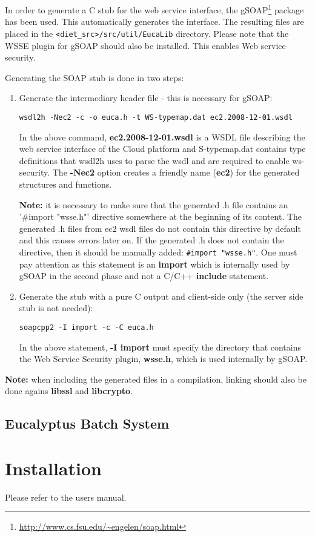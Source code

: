 In order to generate a C stub for the web service interface, the gSOAP\footnote{\url{http://www.cs.fsu.edu/~engelen/soap.html}}
package has been used. This automatically generates the interface. The resulting files
are placed in the \verb!<diet_src>/src/util/EucaLib! directory. Please note that the WSSE
plugin for gSOAP should also be installed. This enables Web service security.

Generating the SOAP stub is done in two steps:
\begin{enumerate}
\item{Generate the intermediary header file} - this is necessary for gSOAP:

\verb!wsdl2h -Nec2 -c -o euca.h -t WS-typemap.dat ec2.2008-12-01.wsdl!

In the above command, \textbf{ec2.2008-12-01.wsdl} is a WSDL file describing the web service
interface of the Cloud platform and S-typemap.dat contains type definitions that wsdl2h uses
to parse the wsdl and are required to enable ws-security. The \textbf{-Nec2} option creates
a friendly name (\textbf{ec2}) for the generated structures and functions.

\textbf{Note:} it is necessary to make sure that the generated .h file contains an '#import "wsse.h"'
directive somewhere at the beginning of its content. The generated .h files from ec2 wsdl files do not
contain this directive by default and this causes errors later on. If the generated .h does not contain
the directive, then it should be manually added: \verb!#import "wsse.h"!. One must pay attention as this
statement is an \textbf{import} which is internally used by gSOAP in the second phase and not a C/C++
\textbf{include} statement.
\item{Generate the stub} with a pure C output and client-side only (the server side stub is not needed):

\verb!soapcpp2 -I import -c -C euca.h!

In the above statement, \textbf{-I import} must specify the directory that contains the Web Service Security plugin, \textbf{wsse.h}, which
is used internally by gSOAP.
\end{enumerate}

\textbf{Note:} when including the generated files in a compilation, linking should also be done agains
\textbf{libssl} and \textbf{libcrypto}.

\subsection{Eucalyptus Batch System}



\section{Installation}

Please refer to the users manual.


